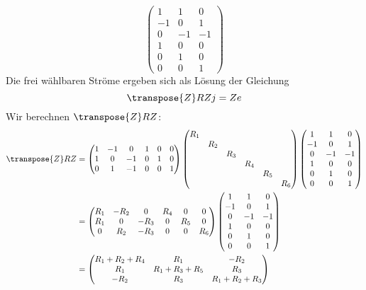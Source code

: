 \begin{loesung}
\begin{teilaufgaben}
\[\begin{pmatrix}
 1& 1& 0\\
-1& 0& 1\\
 0&-1&-1\\
 1& 0& 0\\
 0& 1& 0\\
 0& 0& 1
\end{pmatrix}
\]
Die frei wählbaren Ströme ergeben sich als Lösung der
Gleichung
\[
\transpose{Z}RZj=Ze
\]
Wir berechnen $\transpose{Z}RZ$:
\begin{align*}
\transpose{Z}RZ&=
\begin{pmatrix}
   1& -1&  0&  1&  0&  0\\
   1&  0& -1&  0&  1&  0\\
   0&  1& -1&  0&  0&  1
\end{pmatrix}
\begin{pmatrix}
R_1&   &   &   &   &   \\
   &R_2&   &   &   &   \\
   &   &R_3&   &   &   \\
   &   &   &R_4&   &   \\
   &   &   &   &R_5&   \\
   &   &   &   &   &R_6
\end{pmatrix}
\begin{pmatrix}
 1& 1& 0\\
-1& 0& 1\\
 0&-1&-1\\
 1& 0& 0\\
 0& 1& 0\\
 0& 0& 1
\end{pmatrix}
\\
&=
\begin{pmatrix}
 R_1&-R_2&   0& R_4&   0&   0\\
 R_1&   0&-R_3&   0& R_5&   0\\
   0& R_2&-R_3&   0&   0& R_6
\end{pmatrix}
\begin{pmatrix}
 1& 1& 0\\
-1& 0& 1\\
 0&-1&-1\\
 1& 0& 0\\
 0& 1& 0\\
 0& 0& 1
\end{pmatrix}
\\
&=
\begin{pmatrix}
R_1+R_2+R_4&R_1&-R_2\\
R_1&R_1+R_3+R_5&R_3\\
-R_2&R_3&R_1+R_2+R_3
\end{pmatrix}

\end{align*}
\end{teilaufgaben}
\end{loesung}
